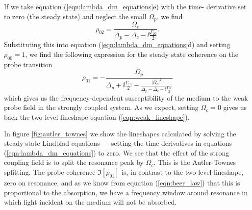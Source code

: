     If we take equation (\ref{eqn:lambda_dm_equations}e) with the time-
    derivative set to zero (\ie the steady state) and neglect the small
    $\Omega_p$, we find
    \begin{equation}
      \rho_{02} = \frac{\Omega_c}{\Delta_p - \Delta_c 
      - \ii \tfrac{\Gamma_{20}}{2}}.
    \end{equation}
    Substituting this into equation (\ref{eqn:lambda_dm_equations}d) and setting
    $\rho_{00} = 1$, we find the following expression for the steady state
    coherence on the probe transition
    \begin{equation}
      \rho_{01} = - \frac{\Omega_p}{\Delta_p + \ii \tfrac{\Gamma_{10}}{2} - 
      \frac{\left| \Omega_c \right|^2 }{\Delta_p - \Delta_c - 
      \ii \tfrac{\Gamma_{20}}{2}}}
    \end{equation}
    which gives us the frequency-dependent susceptibility of the medium to the
    weak probe field in the strongly coupled system. As we expect, setting
    $\Omega_c = 0$ gives us back the two-level lineshape equation
    (\ref{eqn:weak_lineshape}).

    In figure \ref{fig:autler_townes} we show the lineshapes calculated by
    solving the steady-state Lindblad equations --- \ie setting the time
    derivatives in equations (\ref{eqn:lambda_dm_equations}) to zero. We see
    that the effect of the strong coupling field is to split the resonance peak
    by $\Omega_c$. This is the Autler-Townes splitting\cite{Autler1955}. The
    probe coherence $\Im \left[ \rho_{01} \right]$ is, in contrast to the 
    two-level lineshape, zero on resonance, and as we know from equation
    (\ref{eqn:beer_law}) that this is proportional to the absorption, we have a
    frequency window around resonance in which light incident on the medium will
    not be absorbed.


